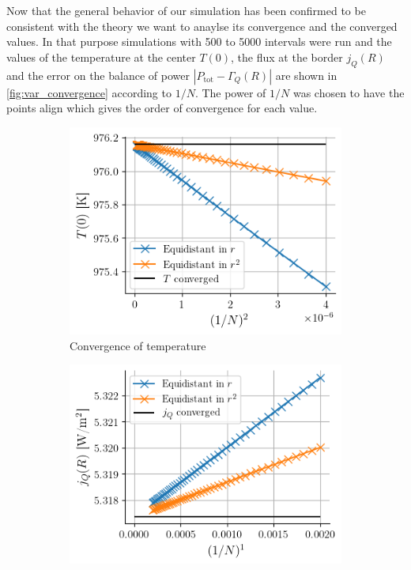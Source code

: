 Now that the general behavior of our simulation has been confirmed to be consistent with the theory we want to anaylse its convergence and the converged values. In that purpose simulations with 500 to 5000 intervals were run and the values of the temperature at the center $T(0)$, the flux at the border $j_Q(R)$ and the error on the balance of power $|P_\mathrm{tot} - \Gamma_Q(R)|$ are shown in \autoref{fig:var_convergence} according to $1/N$. The power of $1/N$ was chosen to have the points align which gives the order of convergence for each value.
\begin{figure}[H]
    \centering
    \begin{subfigure}{0.48\linewidth}
        \centering
        \includegraphics[width=\linewidth]{figures/var_conv_T.png}
        \caption{Convergence of temperature}
        \label{fig:var_conv_T}
    \end{subfigure}
    \begin{subfigure}{0.48\linewidth}
        \centering
        \includegraphics[width=\linewidth]{figures/var_conv_j.png}

\end{subfigure}
\end{figure}
